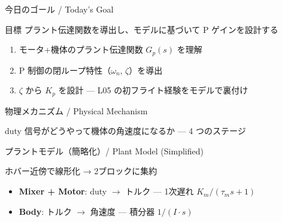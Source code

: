 \begin{frame}{今日のゴール / Today's Goal}
  \begin{block}{目標}
    プラント伝達関数を導出し、モデルに基づいて P ゲインを設計する
  \end{block}

  \vspace{1em}

  \begin{enumerate}
    \item モータ+機体のプラント伝達関数 $G_p(s)$ を理解
    \item P 制御の閉ループ特性（$\omega_n$, $\zeta$）を導出
    \item $\zeta$ から $K_p$ を設計 --- L05 の初フライト経験をモデルで裏付け
  \end{enumerate}
\end{frame}

\begin{frame}{物理メカニズム / Physical Mechanism}
  \begin{center}
    \vspace{-2mm}
    \resizebox{0.95\textwidth}{!}{}
  \end{center}

  \vspace{-0.5em}

  {\small duty 信号がどうやって機体の角速度になるか --- 4 つのステージ}
\end{frame}

\begin{frame}{プラントモデル（簡略化）/ Plant Model (Simplified)}
  \begin{center}
    \vspace{-2mm}
    \resizebox{0.85\textwidth}{!}{}
  \end{center}

  \vspace{-0.5em}

  \begin{exampleblock}{ホバー近傍で線形化 → 2ブロックに集約}
    \begin{itemize}
      \item \textbf{Mixer + Motor}: duty $\to$ トルク
            --- 1次遅れ $K_m/(\tau_m s + 1)$
      \item \textbf{Body}: トルク $\to$ 角速度
            --- 積分器 $1/(I \cdot s)$
    \end{itemize}
  \end{exampleblock}
\end{frame}

